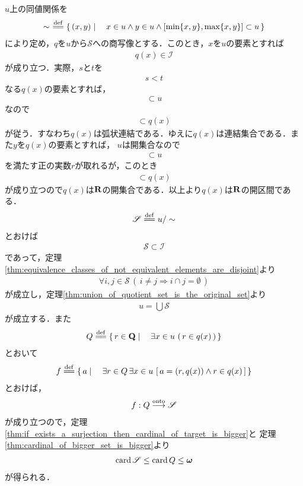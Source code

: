 	\begin{sketch}
		$u$上の同値関係を
		\begin{align}
			\sim\ \defeq \Set{(x,y)}{x \in u \wedge y \in u \wedge \left[\min\{x,y\},\max\{x,y\}\right] \subset u}
		\end{align}
		により定め，$q$を$u$から$\mathscr{S}$への商写像とする．このとき，$x$を$u$の要素とすれば
		\begin{align}
			q(x) \in \mathscr{I}
		\end{align}
		が成り立つ．実際，$s$と$t$を
		\begin{align}
			s < t
		\end{align}
		なる$q(x)$の要素とすれば，
		\begin{align}
			[s,t] \subset u
		\end{align}
		なので
		\begin{align}
			[s,t] \subset q(x)
		\end{align}
		が従う．すなわち$q(x)$は弧状連結である．ゆえに$q(x)$は連結集合である．また$y$を$q(x)$の要素とすれば，
		$u$は開集合なので
		\begin{align}
			[y-r,y+r] \subset u
		\end{align}
		を満たす正の実数$r$が取れるが，このとき
		\begin{align}
			[y-r,y+r] \subset q(x)
		\end{align}
		が成り立つので$q(x)$は$\mathbf{R}$の開集合である．以上より$q(x)$は$\mathbf{R}$の開区間である．
		\begin{align}
			\mathscr{S} \defeq u/\sim
		\end{align}
		とおけば
		\begin{align}
			\mathscr{S} \subset \mathscr{I}
		\end{align}
		であって，定理\ref{thm:equivalence_classes_of_not_equivalent_elements_are_disjoint}より
		\begin{align}
			\forall i,j \in \mathscr{S}\, \left(\, i \neq j \Longrightarrow i \cap j = \emptyset\, \right)
		\end{align}
		が成立し，定理\ref{thm:union_of_quotient_set_is_the_original_set}より
		\begin{align}
			u = \bigcup \mathscr{S}
		\end{align}
		が成立する．また
		\begin{align}
			Q \defeq \Set{r \in \Q}{\exists x \in u\, \left(\, r \in q(x)\, \right)}
		\end{align}
		とおいて
		\begin{align}
			f \defeq \Set{a}{\exists r \in Q \, \exists x \in u\, \left[\, a = (r,q(x)) \wedge r \in q(x)\, \right]}
		\end{align}
		とおけば，
		\begin{align}
			f: Q \overset{\mathrm{onto}}{\longrightarrow} \mathscr{S}
		\end{align}
		が成り立つので，定理\ref{thm:if_exists_a_surjection_then_cardinal_of_target_is_bigger}と
		定理\ref{thm:cardinal_of_bigger_set_is_bigger}より
		\begin{align}
			\operatorname{card} \mathscr{S} \leq \operatorname{card} Q \leq {\boldsymbol \omega}
		\end{align}
		が得られる．
		\QED
	\end{sketch}
	
	\begin{screen}
		\begin{thm}[絶対連続な非減少関数は可測集合を可測集合に写す]
			
		\end{thm}
	\end{screen}